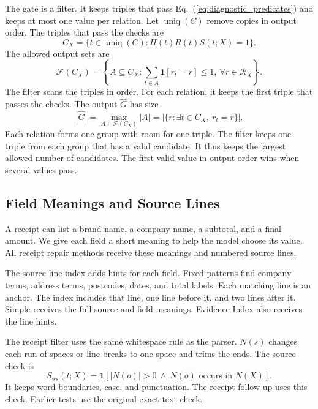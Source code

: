 The gate is a filter. It keeps triples that pass
Eq.~(\ref{eq:diagnostic_predicates}) and keeps at most one value per relation.
Let $\operatorname{uniq}(C)$ remove copies in output order. The triples that
pass the checks are
\begin{equation}
    \label{eq:eligible_candidates}
    C_X=\{t\in\operatorname{uniq}(C):H(t)R(t)S(t;X)=1\}.
\end{equation}
The allowed output sets are
\begin{equation}
    \label{eq:admissible_subsets}
    \mathcal F(C_X)=\left\{A\subseteq C_X:
    \sum_{t\in A}\mathbf1[r_t=r]\leq1,\ \forall r\in\mathcal R_X\right\}.
\end{equation}
The filter scans the triples in order. For each relation, it keeps the first
triple that passes the checks. The output $\widehat G$ has size
\begin{equation}
    \label{eq:selection_size}
    |\widehat G|=\max_{A\in\mathcal F(C_X)}|A|
    =|\{r:\exists t\in C_X,\ r_t=r\}|.
\end{equation}
Each relation forms one group with room for one triple.
The filter keeps one triple from each group that has a valid candidate.
It thus keeps the largest allowed number of candidates.
The first valid value in output order wins when several values pass.

\subsection{Field Meanings and Source Lines}
\label{sec:framework:field_evidence}

A receipt can list a brand name, a company name, a subtotal, and a final
amount. We give each field a short meaning to help the model choose its
value. All receipt repair methods receive these meanings and numbered
source lines.

The source-line index adds hints for each field. Fixed patterns find company
terms, address terms, postcodes, dates, and total labels. Each matching line
is an anchor. The index includes that line, one line before it, and two
lines after it. Simple receives the full source and field meanings.
Evidence Index also receives the line hints.

The receipt filter uses the same whitespace rule as the parser.
$N(s)$ changes each run of spaces or line breaks to one space and trims the
ends. The source check is
\begin{equation}
    S_{\mathrm{ws}}(t;X)=\mathbf1[|N(o)|>0\ \wedge\
    N(o)\text{ occurs in }N(X)].
\end{equation}
It keeps word boundaries, case, and punctuation. The receipt follow-up uses
this check. Earlier tests use the original exact-text check.
